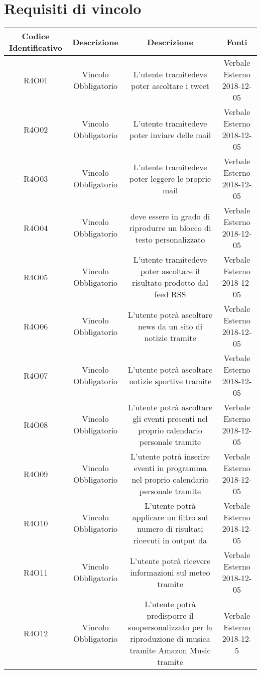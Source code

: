 \section{Requisiti di vincolo}
\begin{tabularx}{\textwidth}{|C|C|C|C|}
	\hline
	\textbf{Codice Identificativo}& \textbf{Descrizione} & \textbf{Descrizione} & \textbf{Fonti}\\
	\hline	
	\endhead
	R4O01&Vincolo Obbligatorio  &L'utente tramitedeve poter ascoltare i tweet & Verbale Esterno 2018-12-05 \\
	\hline
	R4O02&Vincolo Obbligatorio  &L'utente tramitedeve poter inviare delle mail & Verbale Esterno 2018-12-05 \\
	\hline
	R4O03&Vincolo Obbligatorio  &L'utente tramitedeve poter leggere le proprie mail & Verbale Esterno 2018-12-05 \\
	\hline
	R4O04&Vincolo Obbligatorio  & deve essere in grado di riprodurre un blocco di testo personalizzato & Verbale Esterno 2018-12-05 \\
	\hline
	R4O05&Vincolo Obbligatorio  &L'utente tramitedeve poter ascoltare il risultato prodotto dal feed RSS & Verbale Esterno 2018-12-05 \\
	\hline
	R4O06 &Vincolo Obbligatorio& L'utente potrà ascoltare news da un sito di notizie tramite &Verbale Esterno 2018-12-05\\
	\hline
	R4O07 &Vincolo Obbligatorio& L'utente potrà ascoltare notizie sportive tramite &Verbale Esterno 2018-12-05\\
	\hline
	R4O08 &Vincolo Obbligatorio&L'utente potrà ascoltare gli eventi presenti nel proprio calendario personale tramite  &Verbale Esterno 2018-12-05\\
	\hline
	R4O09 &Vincolo Obbligatorio& L'utente potrà inserire eventi in programma nel proprio calendario personale  tramite& Verbale Esterno 2018-12-05\\
	\hline
	R4O10 &Vincolo Obbligatorio &L'utente potrà applicare un filtro sul numero di risultati ricevuti in output da &Verbale Esterno 2018-12-05\\
	\hline
	R4O11 &Vincolo Obbligatorio &L'utente potrà ricevere informazioni sul meteo tramite & Verbale Esterno 2018-12-05\\
	\hline
	R4O12&Vincolo Obbligatorio&L'utente potrà predisporre il suopersonalizzato per la riproduzione di musica tramite Amazon Music tramite& Verbale Esterno 2018-12-5 \\

\end{tabularx}
